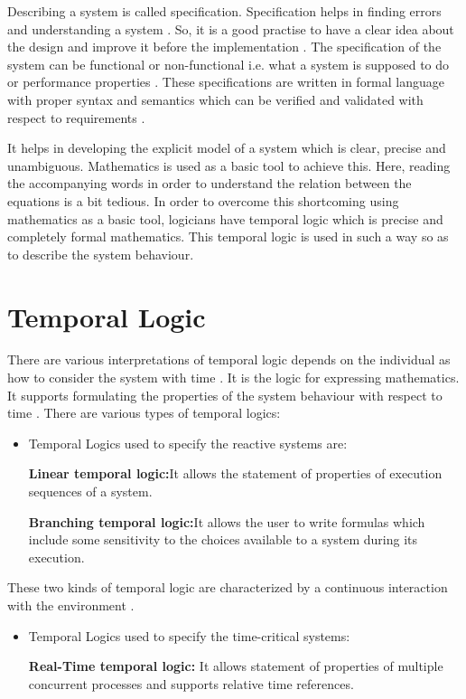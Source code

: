 \documentclass[a4paper,10pt]{report}
\begin{document}
Describing a system is called specification. Specification helps in finding errors and understanding a system \cite{Wang2007}. So, it is a good practise to have a clear idea about the design and improve it before the implementation \cite{ErichGamma1995}. The specification of the system can be functional or non-functional i.e. what a system is supposed to do or performance properties \cite{Wang2007}. These specifications are written in formal language with proper syntax and semantics which can be verified and validated with respect to requirements \cite{D.Jackson}.

It helps in developing the explicit model of a system which is clear, precise and unambiguous. Mathematics is used as a basic tool to achieve this. Here, reading the accompanying words in order to understand the relation between the equations is a bit tedious. In order to overcome this shortcoming using mathematics as a basic tool, logicians have temporal logic which is precise and completely formal mathematics. This temporal logic is used in such a way so as to describe the system behaviour. 

\section{Temporal Logic} 
\label{Temp Logic}

There are various interpretations of temporal logic depends on the individual as how to consider the system with time \cite{Berard}. It is the logic for expressing mathematics. It supports formulating the properties of the system behaviour with respect to time \cite{Berard}. There are various types of temporal logics:
\begin{itemize}
\item Temporal Logics used to specify the reactive systems are:

\textbf{Linear temporal logic:}It allows the statement of properties of execution sequences of a system.

 \textbf{Branching temporal logic:}It allows the user to write formulas which include some sensitivity to the choices available to a system during its execution.
\end{itemize}
 These two kinds of temporal logic are characterized by a continuous interaction with the environment \cite{Engler}.
\begin{itemize}
\item Temporal Logics used to specify the time-critical systems:

 \textbf{Real-Time temporal logic:}  It allows statement of properties of multiple concurrent processes and supports relative time references.
\end{itemize}
\end{document}

